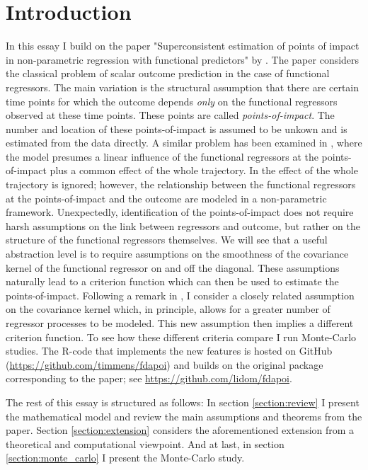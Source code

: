\section{Introduction}

In this essay I build on the paper "Superconsistent estimation of points of impact in
non-parametric regression with functional predictors" by \cite{Kneip2020}. The paper
considers the classical problem of scalar outcome prediction in the case of functional
regressors. The main variation is the structural assumption that there are certain time
points for which the outcome depends \emph{only} on the functional regressors observed
at these time points. These points are called \emph{points-of-impact}. The number and
location of these points-of-impact is assumed to be unkown and is estimated from the
data directly. A similar problem has been examined in \cite{Kneip2016}, where the model
presumes a linear influence of the functional regressors at the points-of-impact plus a
common effect of the whole trajectory. In \cite{Kneip2020} the effect of the whole
trajectory is ignored; however, the relationship between the functional regressors at
the points-of-impact and the outcome are modeled in a non-parametric framework.
Unexpectedly, identification of the points-of-impact does not require harsh assumptions
on the link between regressors and outcome, but rather on the structure of the
functional regressors themselves. We will see that a useful abstraction level is to
require assumptions on the smoothness of the covariance kernel of the functional
regressor on and off the diagonal. These assumptions naturally lead to a criterion
function which can then be used to estimate the points-of-impact. Following a remark in
\cite{Kneip2020}, I consider a closely related assumption on the covariance kernel
which, in principle, allows for a greater number of regressor processes to be modeled.
This new assumption then implies a different criterion function. To see how these
different criteria compare I run Monte-Carlo studies. The \textsf{R}-code that
implements the new features is hosted on GitHub
(\url{https://github.com/timmens/fdapoi}) and builds on the original package
corresponding to the paper; see \url{https://github.com/lidom/fdapoi}.

The rest of this essay is structured as follows: In section \ref{section:review} I
present the mathematical model and review the main assumptions and theorems from the
paper. Section \ref{section:extension} considers the aforementioned extension from a
theoretical and computational viewpoint. And at last, in section
\ref{section:monte_carlo} I present the Monte-Carlo study.
